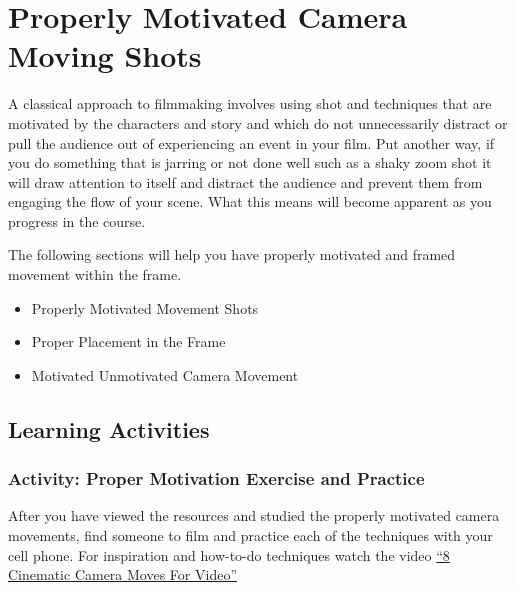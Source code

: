 \documentclass[
]{book}
\providecommand{\tightlist}{%
  \setlength{\itemsep}{0pt}\setlength{\parskip}{0pt}}
\begin{document}
\hypertarget{properly-motivated-camera-moving-shots}{%
\section{Properly Motivated Camera Moving Shots}\label{properly-motivated-camera-moving-shots}}

A classical approach to filmmaking involves using shot and techniques that are motivated by the characters and story and which do not unnecessarily distract or pull the audience out of experiencing an event in your film. Put another way, if you do something that is jarring or not done well such as a shaky zoom shot it will draw attention to itself and distract the audience and prevent them from engaging the flow of your scene. What this means will become apparent as you progress in the course.

The following sections will help you have properly motivated and framed movement within the frame.

\begin{itemize}
\tightlist
\item
  Properly Motivated Movement Shots
\item
  Proper Placement in the Frame
\item
  Motivated Unmotivated Camera Movement
\end{itemize}

\hypertarget{learning-activities-6}{%
\subsection*{Learning Activities}\label{learning-activities-6}}

\begin{reflect}
\hypertarget{activity-proper-motivation-exercise-and-practice}{%
\subsubsection*{Activity: Proper Motivation Exercise and Practice}\label{activity-proper-motivation-exercise-and-practice}}

After you have viewed the resources and studied the properly motivated camera movements, find someone to film and practice each of the techniques with your cell phone. For inspiration and how-to-do techniques watch the video \href{https://www.youtube.com/watch?v=6_p93J3OwfU}{``8 Cinematic Camera Moves For Video''}
\end{reflect}
\end{document}
